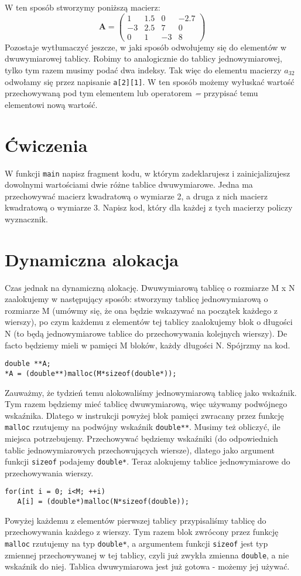 \documentclass{instrukcja}
\begin{document}
W ten sposób stworzymy poniższą macierz:
\begin{equation}
\mathbf{A} = 
\left(
\begin{array}{cccc}
1 & 1.5 & 0 & -2.7 \\ -3 & 2.5 & 7 & 0 \\ 0 & 1 & -3 & 8
\end{array}
\right)
\end{equation}
Pozostaje wytłumaczyć jeszcze, w jaki sposób odwołujemy się do elementów w dwuwymiarowej tablicy. Robimy to analogicznie do tablicy jednowymiarowej, tylko tym razem musimy podać dwa indeksy. Tak więc do elementu macierzy $a_{32}$ odwołamy się przez napisanie {\tt a[2][1]}. W ten sposób możemy wyłuskać wartość przechowywaną pod tym elementem lub operatorem {\it =} przypisać temu elementowi nową wartość.

\section*{Ćwiczenia}
W funkcji {\tt main} napisz fragment kodu, w którym zadeklarujesz i zainicjalizujesz dowolnymi wartościami dwie różne tablice dwuwymiarowe. Jedna ma przechowywać macierz kwadratową o wymiarze 2, a druga z nich macierz kwadratową o wymiarze 3. Napisz kod, który dla każdej z tych macierzy policzy wyznacznik.

\section*{Dynamiczna alokacja}
Czas jednak na dynamiczną alokację. Dwuwymiarową tablicę o rozmiarze M x N zaalokujemy w następujący sposób: stworzymy tablicę jednowymiarową o rozmiarze M (umówmy się, że ona będzie wskazywać na początek każdego z wierszy), po czym każdemu z elementów tej tablicy zaalokujemy blok o długości N (to będą jednowymiarowe tablice do przechowywania kolejnych wierszy). De facto będziemy mieli w pamięci M bloków, każdy długości N. Spójrzmy na kod.
\begin{verbatim}
double **A;
*A = (double**)malloc(M*sizeof(double*));
\end{verbatim}
Zauważmy, że tydzień temu alokowaliśmy jednowymiarową tablicę jako wskaźnik. Tym razem będziemy mieć tablicę dwuwymiarową, więc używamy podwójnego wskaźnika. Dlatego w instrukcji powyżej blok pamięci zwracany przez funkcję {\tt malloc} rzutujemy na podwójny wskaźnik {\tt double**}. Musimy też obliczyć, ile miejsca potrzebujemy. Przechowywać będziemy wskaźniki (do odpowiednich tablic jednowymiarowych przechowujących wiersze), dlatego jako argument funkcji {\tt sizeof} podajemy {\tt double*}. Teraz alokujemy tablice jednowymiarowe do przechowywania wierszy.
\begin{verbatim}
for(int i = 0; i<M; ++i)
   A[i] = (double*)malloc(N*sizeof(double));
\end{verbatim}
Powyżej każdemu z elementów pierwszej tablicy przypisaliśmy tablicę do przechowywania każdego z wierszy. Tym razem blok zwrócony przez funkcję {\tt malloc} rzutujemy na typ {\tt double*}, a argumentem funkcji {\tt sizeof} jest typ zmiennej przechowywanej w tej tablicy, czyli już zwykła zmienna {\tt double}, a nie wskaźnik do niej. Tablica dwuwymiarowa jest już gotowa - możemy jej używać.
\end{document}
